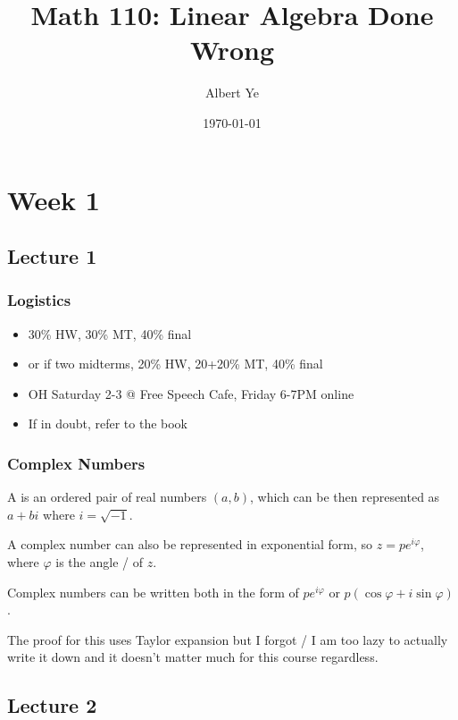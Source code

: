 \documentclass{book}
\title{Math 110: Linear Algebra Done Wrong}
\author{Albert Ye}
\date{\today}
\begin{document}
\maketitle
\mytoc 
\chapter{Week 1}
\section{Lecture 1}
\subsection{Logistics}
\begin{itemize}
	\item 30\% HW, 30\% MT, 40\% final
	\item or if two midterms, 20\% HW, 20+20\% MT, 40\% final 
	\item OH Saturday 2-3 @ Free Speech Cafe, Friday 6-7PM online
	\item If in doubt, refer to the book
\end{itemize}
\subsection{Complex Numbers}
\begin{definition}
	A  is an ordered pair of real numbers $(a, b)$, which can be then represented as $a + bi$ where $i = \sqrt{-1}$.
\end{definition}
A complex number can also be represented in exponential form, so $z = pe^{i\varphi}$, where $\varphi$ is the angle /  of $z$.

\begin{theorem}[DeMoivre's]
	Complex numbers can be written both in the form of $pe^{i\varphi}$ or $p(\cos \varphi + i \sin \varphi)$.
\end{theorem}

The proof for this uses Taylor expansion but I forgot / I am too lazy to actually write it down and it doesn't matter much for this course regardless.

\section{Lecture 2}
\end{document}
